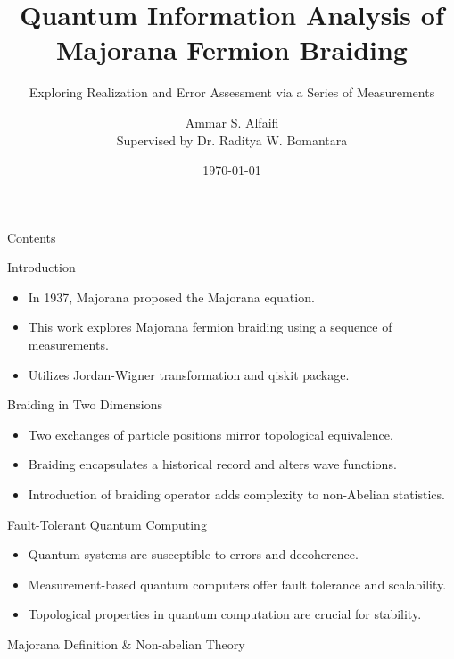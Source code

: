 \documentclass{loyola-beamer}
\title{Quantum Information Analysis of Majorana Fermion Braiding}
\subtitle{Exploring Realization and Error Assessment via a Series of Measurements}
\author{Ammar S. Alfaifi \\ Supervised by Dr. Raditya W. Bomantara}
\date{\today}
\institute{KFUPM}
\begin{document}
\begin{titleframe}{}
	\maketitle
\end{titleframe}

\begin{frame}{Contents}
	\tableofcontents
\end{frame}

\begin{frame}{Introduction}
	\begin{itemize}
		\item In 1937, Majorana proposed the Majorana equation.
		\item This work explores Majorana fermion braiding using a sequence of measurements.
		\item Utilizes Jordan-Wigner transformation and qiskit package.
	\end{itemize}
\end{frame}

\begin{frame}{Braiding in Two Dimensions}
	\begin{itemize}
		\item Two exchanges of particle positions mirror topological equivalence.
		\item Braiding encapsulates a historical record and alters wave functions.
		\item Introduction of braiding operator adds complexity to non-Abelian statistics.
	\end{itemize}
\end{frame}

\begin{frame}{Fault-Tolerant Quantum Computing}
	\begin{itemize}
		\item Quantum systems are susceptible to errors and decoherence.
		\item Measurement-based quantum computers offer fault tolerance and scalability.
		\item Topological properties in quantum computation are crucial for stability.
	\end{itemize}
\end{frame}

\begin{titleframe}{Majorana Definition \& Non-abelian Theory}
\end{titleframe}
\end{document}
